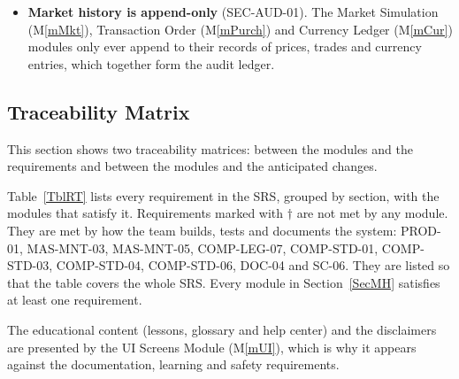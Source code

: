 \documentclass[12pt, titlepage]{article}
\newcommand{\mref}[1]{M\ref{#1}}
\begin{document}
\begin{itemize}
  (\mref{mAPI}) (PR-RFT-04, MAS-ADPT-02). It keeps the last data received and
  marks it as possibly out of date when the backend cannot be reached. Another
  mobile platform would only need its own screens and API client, since all
  calculations are done on the backend.
\item \textbf{Market history is append-only} (SEC-AUD-01). The Market
  Simulation (\mref{mMkt}), Transaction Order (\mref{mPurch}) and Currency
  Ledger (\mref{mCur}) modules only ever append to their records of prices,
  trades and currency entries, which together form the audit ledger.
\end{itemize}

\subsection{Traceability Matrix} \label{SecTM}

This section shows two traceability matrices: between the modules and the
requirements and between the modules and the anticipated changes.

Table~\ref{TblRT} lists every requirement in the SRS, grouped by section, with
the modules that satisfy it. Requirements marked with $\dagger$ are not met by
any module. They are met by how the team builds, tests and documents the
system: PROD-01, MAS-MNT-03, MAS-MNT-05, COMP-LEG-07, COMP-STD-01,
COMP-STD-03, COMP-STD-04, COMP-STD-06, DOC-04 and SC-06. They are listed so
that the table covers the whole SRS. Every module in Section~\ref{SecMH}
satisfies at least one requirement.

The educational content (lessons, glossary and help center) and the
disclaimers are presented by the UI Screens Module (\mref{mUI}), which is
why it appears against the documentation, learning and safety requirements.
\end{document}
